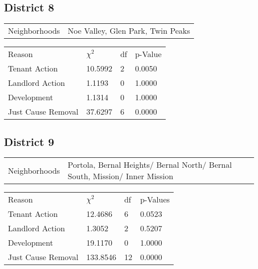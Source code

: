 \documentclass[]{article}
\begin{document}
\subsection{District 8}

\begin{table}[h]
	\centering
	\begin{tabular}{l | l}
		Neighborhoods & Noe Valley, Glen Park, Twin Peaks
	\end{tabular}
\end{table}
\FloatBarrier

\begin {table}[h]
\centering
\begin{tabular}{l | l | l | l}
	
	Reason				 &  $\chi ^{2}$ & df & p-Value \\
	Tenant Action 		   &  10.5992  &  2 & 0.0050 \\
	Landlord Action	       &  1.1193  &  0 & 1.0000 \\
	Development			   &  1.1314  & 0  & 1.0000 \\
	Just Cause Removal	   &  37.6297  &  6 & 0.0000 \\
\end{tabular} \newline
\end{table}
\FloatBarrier

\subsection{District 9}

\begin {table}[h]
\centering
\begin{tabular}{l | l}
	Neighborhoods &  Portola, Bernal Heights/ Bernal North/ Bernal South, Mission/ Inner Mission
\end{tabular}
\begin{tabular}{l | l | l | l}
	
	Reason				 &  $\chi ^{2}$ & df & p-Values\\
	Tenant Action 		   & 12.4686   &  6 & 0.0523 \\
	Landlord Action	       &  1.3052  & 2  & 0.5207 \\
	Development			   &  19.1170  & 0  & 1.0000 \\
	Just Cause Removal	   &  133.8546  & 12  & 0.0000 \\
\end{tabular} \newline
\end{table}
\FloatBarrier
\end{document}
